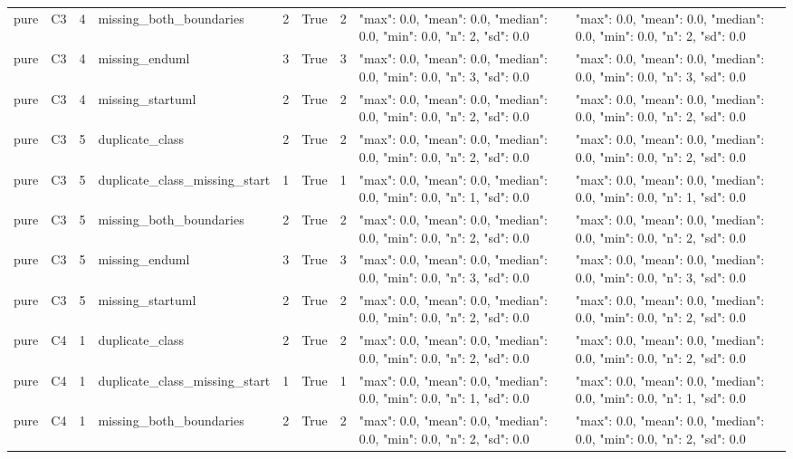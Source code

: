 \begin{tabular}{lllllllll}
pure & C3 & 4 & missing\_both\_boundaries & 2 & True & 2 & {"max": 0.0, "mean": 0.0, "median": 0.0, "min": 0.0, "n": 2, "sd": 0.0} & {"max": 0.0, "mean": 0.0, "median": 0.0, "min": 0.0, "n": 2, "sd": 0.0} \\
pure & C3 & 4 & missing\_enduml & 3 & True & 3 & {"max": 0.0, "mean": 0.0, "median": 0.0, "min": 0.0, "n": 3, "sd": 0.0} & {"max": 0.0, "mean": 0.0, "median": 0.0, "min": 0.0, "n": 3, "sd": 0.0} \\
pure & C3 & 4 & missing\_startuml & 2 & True & 2 & {"max": 0.0, "mean": 0.0, "median": 0.0, "min": 0.0, "n": 2, "sd": 0.0} & {"max": 0.0, "mean": 0.0, "median": 0.0, "min": 0.0, "n": 2, "sd": 0.0} \\
pure & C3 & 5 & duplicate\_class & 2 & True & 2 & {"max": 0.0, "mean": 0.0, "median": 0.0, "min": 0.0, "n": 2, "sd": 0.0} & {"max": 0.0, "mean": 0.0, "median": 0.0, "min": 0.0, "n": 2, "sd": 0.0} \\
pure & C3 & 5 & duplicate\_class\_missing\_start & 1 & True & 1 & {"max": 0.0, "mean": 0.0, "median": 0.0, "min": 0.0, "n": 1, "sd": 0.0} & {"max": 0.0, "mean": 0.0, "median": 0.0, "min": 0.0, "n": 1, "sd": 0.0} \\
pure & C3 & 5 & missing\_both\_boundaries & 2 & True & 2 & {"max": 0.0, "mean": 0.0, "median": 0.0, "min": 0.0, "n": 2, "sd": 0.0} & {"max": 0.0, "mean": 0.0, "median": 0.0, "min": 0.0, "n": 2, "sd": 0.0} \\
pure & C3 & 5 & missing\_enduml & 3 & True & 3 & {"max": 0.0, "mean": 0.0, "median": 0.0, "min": 0.0, "n": 3, "sd": 0.0} & {"max": 0.0, "mean": 0.0, "median": 0.0, "min": 0.0, "n": 3, "sd": 0.0} \\
pure & C3 & 5 & missing\_startuml & 2 & True & 2 & {"max": 0.0, "mean": 0.0, "median": 0.0, "min": 0.0, "n": 2, "sd": 0.0} & {"max": 0.0, "mean": 0.0, "median": 0.0, "min": 0.0, "n": 2, "sd": 0.0} \\
pure & C4 & 1 & duplicate\_class & 2 & True & 2 & {"max": 0.0, "mean": 0.0, "median": 0.0, "min": 0.0, "n": 2, "sd": 0.0} & {"max": 0.0, "mean": 0.0, "median": 0.0, "min": 0.0, "n": 2, "sd": 0.0} \\
pure & C4 & 1 & duplicate\_class\_missing\_start & 1 & True & 1 & {"max": 0.0, "mean": 0.0, "median": 0.0, "min": 0.0, "n": 1, "sd": 0.0} & {"max": 0.0, "mean": 0.0, "median": 0.0, "min": 0.0, "n": 1, "sd": 0.0} \\
pure & C4 & 1 & missing\_both\_boundaries & 2 & True & 2 & {"max": 0.0, "mean": 0.0, "median": 0.0, "min": 0.0, "n": 2, "sd": 0.0} & {"max": 0.0, "mean": 0.0, "median": 0.0, "min": 0.0, "n": 2, "sd": 0.0} \\

\end{tabular}
